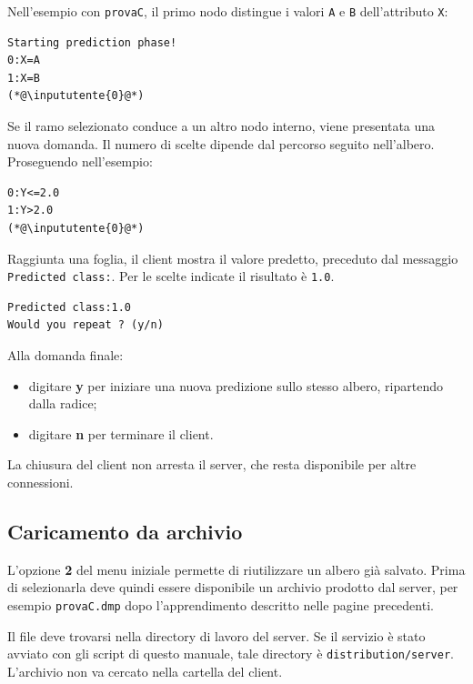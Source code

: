 \documentclass[11pt,a4paper]{article}
\begin{document}
Nell'esempio con \texttt{provaC}, il primo nodo distingue i valori
\texttt{A} e \texttt{B} dell'attributo \texttt{X}:

\begin{lstlisting}
Starting prediction phase!
0:X=A
1:X=B
(*@\inpututente{0}@*)
\end{lstlisting}

Se il ramo selezionato conduce a un altro nodo interno, viene presentata una
nuova domanda. Il numero di scelte dipende dal percorso seguito nell'albero.
Proseguendo nell'esempio:

\begin{lstlisting}
0:Y<=2.0
1:Y>2.0
(*@\inpututente{0}@*)
\end{lstlisting}

Raggiunta una foglia, il client mostra il valore predetto, preceduto dal
messaggio \texttt{Predicted class:}. Per le scelte indicate il risultato è
\texttt{1.0}.

\begin{lstlisting}
Predicted class:1.0
Would you repeat ? (y/n)
\end{lstlisting}

Alla domanda finale:
\begin{itemize}
  \item digitare \textbf{y} per iniziare una nuova predizione sullo stesso
        albero, ripartendo dalla radice;
  \item digitare \textbf{n} per terminare il client.
\end{itemize}

La chiusura del client non arresta il server, che resta disponibile per altre
connessioni.

\clearpage
\subsection*{Caricamento da archivio}

L'opzione \textbf{2} del menu iniziale permette di riutilizzare un albero già
salvato. Prima di selezionarla deve quindi essere disponibile un archivio
prodotto dal server, per esempio \texttt{provaC.dmp} dopo l'apprendimento
descritto nelle pagine precedenti.

Il file deve trovarsi nella directory di lavoro del server. Se il servizio è
stato avviato con gli script di questo manuale, tale directory è
\texttt{distribution/server}. L'archivio non va cercato nella cartella del
client.
\end{document}
